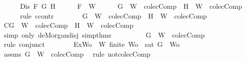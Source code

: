 \begin{isabellebody}
\ \ \ \ \isamarkupfalse%
\ {\isachardoublequoteopen}Dis\ F\ G\ H{\isachardoublequoteclose}\isanewline
\ \ \ \ \isamarkupfalse%
\ {\isachardoublequoteopen}F\ {\isasymin}\ W{\isachardoublequoteclose}\isanewline
\ \ \ \ \isamarkupfalse%
\ {\isachardoublequoteopen}{\isacharbraceleft}G{\isacharbraceright}\ {\isasymunion}\ W\ {\isasymin}\ colecComp\ {\isasymor}\ {\isacharbraceleft}H{\isacharbraceright}\ {\isasymunion}\ W\ {\isasymin}\ colecComp{\isachardoublequoteclose}\isanewline
\ \ \ \ \isamarkupfalse%
\ {\isacharparenleft}rule\ ccontr{\isacharparenright}\isanewline
\ \ \ \ \ \ \isamarkupfalse%
\ {\isachardoublequoteopen}{\isasymnot}{\isacharparenleft}{\isacharbraceleft}G{\isacharbraceright}\ {\isasymunion}\ W\ {\isasymin}\ colecComp\ {\isasymor}\ {\isacharbraceleft}H{\isacharbraceright}\ {\isasymunion}\ W\ {\isasymin}\ colecComp{\isacharparenright}{\isachardoublequoteclose}\isanewline
\ \ \ \ \ \ \isamarkupfalse%
\ \isamarkupfalse%
\ C{\isacharcolon}{\isachardoublequoteopen}{\isacharbraceleft}G{\isacharbraceright}\ {\isasymunion}\ W\ {\isasymnotin}\ colecComp\ {\isasymand}\ {\isacharbraceleft}H{\isacharbraceright}\ {\isasymunion}\ W\ {\isasymnotin}\ colecComp{\isachardoublequoteclose}\isanewline
\ \ \ \ \ \ \ \ \isamarkupfalse%
\ {\isacharparenleft}simp\ only{\isacharcolon}\ de{\isacharunderscore}Morgan{\isacharunderscore}disj\ simp{\isacharunderscore}thms{\isacharparenleft}{}{\isacharparenright}{\isacharparenright}\isanewline
\ \ \ \ \ \ \isamarkupfalse%
\ \isamarkupfalse%
\ {\isachardoublequoteopen}{\isacharbraceleft}G{\isacharbraceright}\ {\isasymunion}\ W\ {\isasymnotin}\ colecComp{\isachardoublequoteclose}\isanewline
\ \ \ \ \ \ \ \ \isamarkupfalse%
\ {\isacharparenleft}rule\ conjunct{}{\isacharparenright}\isanewline
\ \ \ \ \ \ \isamarkupfalse%
\ Ex{}{\isacharcolon}{\isachardoublequoteopen}{\isasymexists}Wo\ {\isasymsubseteq}\ W{\isachardot}\ finite\ Wo\ {\isasymand}\ {\isasymnot}{\isacharparenleft}sat\ {\isacharparenleft}{\isacharbraceleft}G{\isacharbraceright}\ {\isasymunion}\ Wo{\isacharparenright}{\isacharparenright}{\isachardoublequoteclose}\isanewline
\ \ \ \ \ \ \ \ \isamarkupfalse%
\ assms\ {\isacartoucheopen}{\isacharbraceleft}G{\isacharbraceright}\ {\isasymunion}\ W\ {\isasymnotin}\ colecComp{\isacartoucheclose}\ \isamarkupfalse%
\ {\isacharparenleft}rule\ not{\isacharunderscore}colecComp{\isacharparenright}\isanewline

\end{isabellebody}
